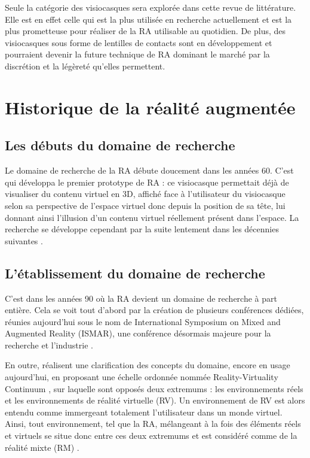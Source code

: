 
Seule la catégorie des visiocasques sera explorée dans cette revue de littérature. Elle est en effet celle qui est la plus utilisée en recherche actuellement et est la plus prometteuse pour réaliser de la RA utilisable au quotidien. \cite{CarmignianiFurhtAnisettiEtAl2011} De plus, des visiocasques sous forme de lentilles de contacts sont en développement et pourraient devenir la future technique de RA dominant le marché par la discrétion et la légèreté qu'elles permettent. \citep{VanKrevelenPoelman2010}


\section{Historique de la réalité augmentée}
\subsection{Les débuts du domaine de recherche}

Le domaine de recherche de la RA débute doucement dans les années 60. C'est \citet{Sutherland1968} qui développa le premier prototype de RA : ce visiocasque permettait déjà de visualiser du contenu virtuel en 3D, affiché face à l'utilisateur du visiocasque selon sa perspective de l'espace virtuel donc depuis la position de sa tête, lui donnant ainsi l'illusion d'un contenu virtuel réellement présent dans l'espace. La recherche se développe cependant par la suite lentement dans les décennies suivantes \citep{VanKrevelenPoelman2010} \citep{CarmignianiFurhtAnisettiEtAl2011}.

\subsection{L'établissement du domaine de recherche}
C'est dans les années 90 où la RA devient un domaine de recherche à part entière. Cela se voit tout d'abord par la création de plusieurs conférences dédiées, réunies aujourd'hui sous le nom de International Symposium on Mixed and Augmented Reality (ISMAR), une conférence désormais majeure pour la recherche et l'industrie \citep{AzumaBaillotBehringerEtAl2001}.

En outre, \citet{MilgramKishino1994} réalisent une clarification des concepts du domaine, encore en usage aujourd'hui, en proposant une échelle ordonnée nommée \foreignlanguage{english}{Reality-Virtuality Continuum} , sur laquelle sont opposés deux extremums : les environnements réels et les environnements de réalité virtuelle (RV). Un environnement de RV est alors entendu comme immergeant totalement l'utilisateur dans un monde virtuel. Ainsi, tout environnement, tel que la RA, mélangeant à la fois des éléments réels et virtuels se situe donc entre ces deux extremums et est considéré comme de la réalité mixte (RM) \citep{MilgramKishino1994}.


